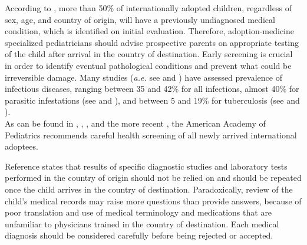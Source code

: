 According to \cite{medicalscreening}, more than 50\% of internationally adopted children, regardless of sex, age, and country of origin, will have a previously undiagnosed medical condition, which is identified on initial evaluation. Therefore, adoption-medicine specialized pediatricians should advise prospective parents on appropriate testing of the child after arrival in the country of destination. Early screening is crucial in order to identify eventual pathological conditions and prevent what could be irreversible damage. Many studies (\textit{a.e.} see \cite{notonlyinfectious} and \cite{obringer}) have assessed prevalence of infectious diseases, ranging between 35 and 42\% for all infections, almost 40\% for parasitic infestations (see \cite{GNLBIexp} and \cite{sollai}), and between 5 and 19\% for tuberculosis (see \cite{sollai} and \cite{ampofo}).\\
As can be found in \cite{initialeval}, \cite{redbook}, \cite{GNLBIexp}, and the more recent \cite{comphealtheval}, the American Academy of Pediatrics recommends careful health screening of all newly arrived international adoptees.

Reference \cite{nelson} states that results of specific diagnostic studies and laboratory tests performed in the country of origin should not be relied on and should be repeated once the child arrives in the country of destination. Paradoxically, review of the child’s medical records may raise more questions than provide answers, because of poor translation and use of medical terminology and medications that are unfamiliar to physicians trained in the country of destination. Each medical diagnosis should be considered carefully before being rejected or accepted.

